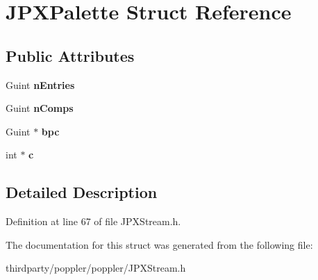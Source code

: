 \hypertarget{struct_j_p_x_palette}{}\section{J\+P\+X\+Palette Struct Reference}
\label{struct_j_p_x_palette}
\subsection*{Public Attributes}
\begin{DoxyCompactItemize}
\item 
\mbox{\label{struct_j_p_x_palette_a06997979f48cabd68f2a602fd1ce72de}} 
Guint {\bfseries n\+Entries}
\item 
\mbox{\label{struct_j_p_x_palette_a8ad5dac8544fadfb0e3bee5e3e6a60fd}} 
Guint {\bfseries n\+Comps}
\item 
\mbox{\label{struct_j_p_x_palette_a887cbb1d5507d84e4370387cdd4a3608}} 
Guint $\ast$ {\bfseries bpc}
\item 
\mbox{\label{struct_j_p_x_palette_ade16c50b78353816a7ea47e9279c1064}} 
int $\ast$ {\bfseries c}
\end{DoxyCompactItemize}


\subsection{Detailed Description}


Definition at line 67 of file J\+P\+X\+Stream.\+h.



The documentation for this struct was generated from the following file\+:\begin{DoxyCompactItemize}
\item 
thirdparty/poppler/poppler/J\+P\+X\+Stream.\+h\end{DoxyCompactItemize}
